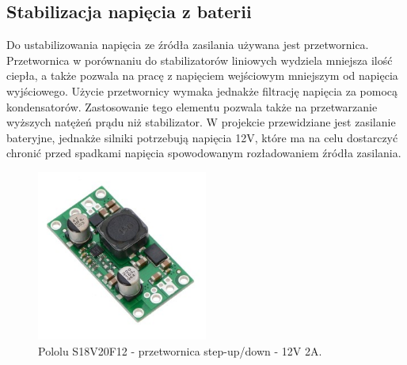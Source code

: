 \subsection{Stabilizacja napięcia z baterii}
Do ustabilizowania napięcia ze źródła zasilania używana jest przetwornica. Przetwornica w porównaniu do stabilizatorów liniowych wydziela mniejsza ilość ciepła, a także pozwala na pracę z napięciem wejściowym mniejszym od napięcia wyjściowego. Użycie przetwornicy wymaka jednakże filtrację napięcia za pomocą kondensatorów. Zastosowanie tego elementu pozwala także na przetwarzanie wyższych natężeń prądu niż stabilizator. W projekcie przewidziane jest zasilanie bateryjne, jednakże silniki potrzebują napięcia 12V, które ma na celu dostarczyć chronić przed spadkami napięcia spowodowanym rozładowaniem źródła zasilania.
\begin{figure}[H]
\centering
\includegraphics[width=0.5\textwidth]{inzynierku/img/przetwornica.jpg}
\caption{\label{fig:przetwornica_up_down}Pololu S18V20F12 - przetwornica step-up/down - 12V 2A.}
\end{figure}

